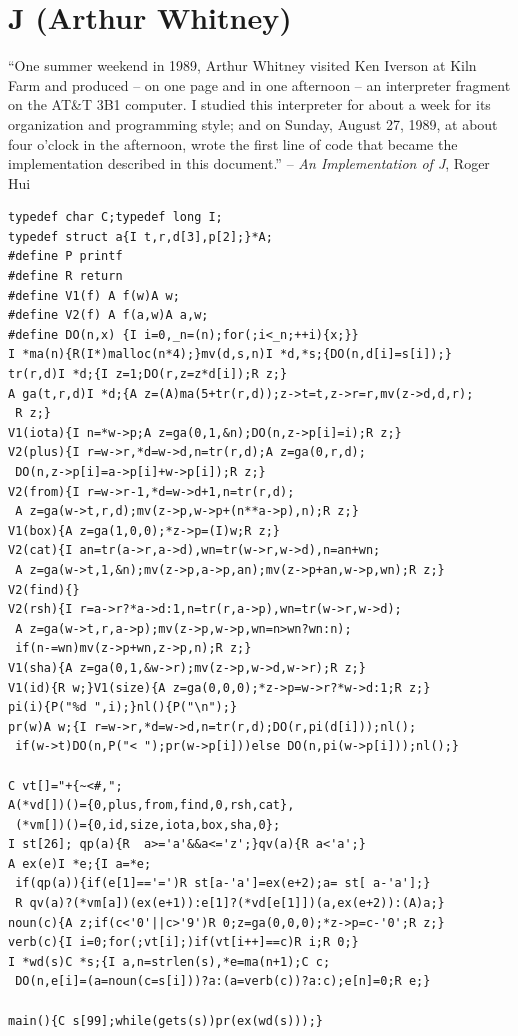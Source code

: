 \documentclass[10pt,twoside,openright]{memoir}
\begin{document}
\chapter{J (Arthur Whitney)}

``One summer weekend in 1989, Arthur Whitney visited Ken Iverson at Kiln Farm and produced -- on one page and in one afternoon -- an interpreter fragment on the AT\&T 3B1 computer. I studied this interpreter for about a week for its organization and programming style; and on Sunday, August 27, 1989, at about four o'clock in the afternoon, wrote the first line of code that became the implementation described in this document.'' -- \textit{An Implementation of J}, Roger Hui


{\tiny
\begin{verbatim}
typedef char C;typedef long I;
typedef struct a{I t,r,d[3],p[2];}*A;
#define P printf
#define R return
#define V1(f) A f(w)A w;
#define V2(f) A f(a,w)A a,w;
#define DO(n,x) {I i=0,_n=(n);for(;i<_n;++i){x;}}
I *ma(n){R(I*)malloc(n*4);}mv(d,s,n)I *d,*s;{DO(n,d[i]=s[i]);}
tr(r,d)I *d;{I z=1;DO(r,z=z*d[i]);R z;}
A ga(t,r,d)I *d;{A z=(A)ma(5+tr(r,d));z->t=t,z->r=r,mv(z->d,d,r);
 R z;}
V1(iota){I n=*w->p;A z=ga(0,1,&n);DO(n,z->p[i]=i);R z;}
V2(plus){I r=w->r,*d=w->d,n=tr(r,d);A z=ga(0,r,d);
 DO(n,z->p[i]=a->p[i]+w->p[i]);R z;}
V2(from){I r=w->r-1,*d=w->d+1,n=tr(r,d);
 A z=ga(w->t,r,d);mv(z->p,w->p+(n**a->p),n);R z;}
V1(box){A z=ga(1,0,0);*z->p=(I)w;R z;}
V2(cat){I an=tr(a->r,a->d),wn=tr(w->r,w->d),n=an+wn;
 A z=ga(w->t,1,&n);mv(z->p,a->p,an);mv(z->p+an,w->p,wn);R z;}
V2(find){}
V2(rsh){I r=a->r?*a->d:1,n=tr(r,a->p),wn=tr(w->r,w->d);
 A z=ga(w->t,r,a->p);mv(z->p,w->p,wn=n>wn?wn:n);
 if(n-=wn)mv(z->p+wn,z->p,n);R z;}
V1(sha){A z=ga(0,1,&w->r);mv(z->p,w->d,w->r);R z;}
V1(id){R w;}V1(size){A z=ga(0,0,0);*z->p=w->r?*w->d:1;R z;}
pi(i){P("%d ",i);}nl(){P("\n");}
pr(w)A w;{I r=w->r,*d=w->d,n=tr(r,d);DO(r,pi(d[i]));nl();
 if(w->t)DO(n,P("< ");pr(w->p[i]))else DO(n,pi(w->p[i]));nl();}

C vt[]="+{~<#,";
A(*vd[])()={0,plus,from,find,0,rsh,cat},
 (*vm[])()={0,id,size,iota,box,sha,0};
I st[26]; qp(a){R  a>='a'&&a<='z';}qv(a){R a<'a';}
A ex(e)I *e;{I a=*e;
 if(qp(a)){if(e[1]=='=')R st[a-'a']=ex(e+2);a= st[ a-'a'];}
 R qv(a)?(*vm[a])(ex(e+1)):e[1]?(*vd[e[1]])(a,ex(e+2)):(A)a;}
noun(c){A z;if(c<'0'||c>'9')R 0;z=ga(0,0,0);*z->p=c-'0';R z;}
verb(c){I i=0;for(;vt[i];)if(vt[i++]==c)R i;R 0;}
I *wd(s)C *s;{I a,n=strlen(s),*e=ma(n+1);C c;
 DO(n,e[i]=(a=noun(c=s[i]))?a:(a=verb(c))?a:c);e[n]=0;R e;}

main(){C s[99];while(gets(s))pr(ex(wd(s)));}
\end{verbatim}
}
\end{document}
